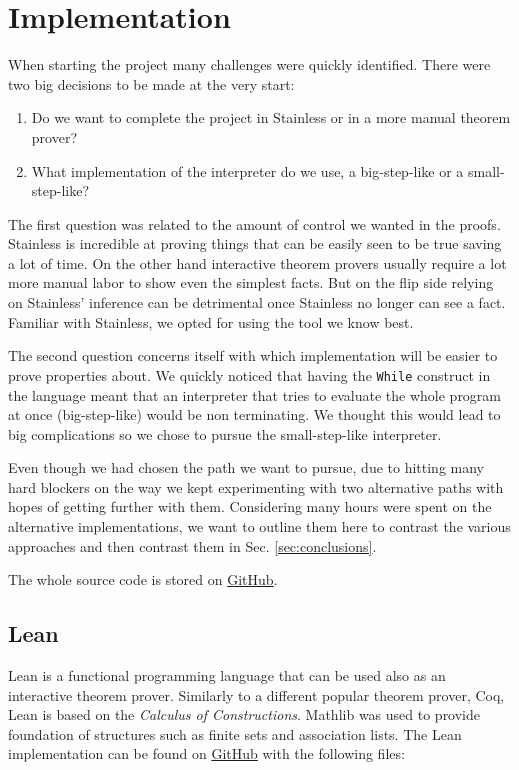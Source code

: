 \section{Implementation}

When starting the project many challenges were quickly identified. There were two big decisions to be made at the very start:

\begin{enumerate}
  \item Do we want to complete the project in Stainless or in a more manual theorem prover?
  \item What implementation of the interpreter do we use, a big-step-like or a small-step-like?
\end{enumerate}

The first question was related to the amount of control we wanted in the proofs. Stainless is incredible at proving things that can be easily seen to be true saving a lot of time. On the other hand interactive theorem provers usually require a lot more manual labor to show even the simplest facts. But on the flip side relying on Stainless' inference can be detrimental once Stainless no longer can see a fact. Familiar with Stainless, we opted for using the tool we know best.

The second question concerns itself with which implementation will be easier to prove properties about. We quickly noticed that having the \texttt{While} construct in the language meant that an interpreter that tries to evaluate the whole program at once (big-step-like) would be non terminating. We thought this would lead to big complications so we chose to pursue the small-step-like interpreter.

Even though we had chosen the path we want to pursue, due to hitting many hard blockers on the way we kept experimenting with two alternative paths with hopes of getting further with them. Considering many hours were spent on the alternative implementations, we want to outline them here to contrast the various approaches and then contrast them in Sec. \ref{sec:conclusions}.

The whole source code is stored on \href{https://github.com/shilangyu/formal-lang}{GitHub}.

\subsection{Lean}

Lean is a functional programming language that can be used also as an interactive theorem prover. Similarly to a different popular theorem prover, Coq, Lean is based on the \textit{Calculus of Constructions}. Mathlib\cite{mathlib} was used to provide foundation of structures such as finite sets and association lists. The Lean implementation can be found on \href{https://github.com/shilangyu/formal-lang/tree/main/lean/Lang}{GitHub} with the following files:

